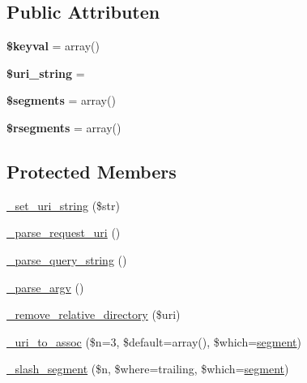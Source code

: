 \subsection*{Public Attributen}
\begin{DoxyCompactItemize}
\item 
\mbox{\label{class_c_i___u_r_i_ae15942155aae4760439f552ad1fc3c34}} 
{\bfseries \$keyval} = array()
\item 
\mbox{\label{class_c_i___u_r_i_ab908b3e655463a05e8a646c965ca4e53}} 
{\bfseries \$uri\+\_\+string} = \textquotesingle{}\textquotesingle{}
\item 
\mbox{\label{class_c_i___u_r_i_a8d7f597e2b6cf2aaef663822d1b96a82}} 
{\bfseries \$segments} = array()
\item 
\mbox{\label{class_c_i___u_r_i_abf60189292b5fda02cdf36e5d7417a33}} 
{\bfseries \$rsegments} = array()
\end{DoxyCompactItemize}
\subsection*{Protected Members}
\begin{DoxyCompactItemize}
\item 
\mbox{\hyperlink{class_c_i___u_r_i_a81a4c4d50fbac24b9ae091f9cfcaade3}{\+\_\+set\+\_\+uri\+\_\+string}} (\$str)
\item 
\mbox{\hyperlink{class_c_i___u_r_i_ae2e75a6f6657df51c7b6de926979af29}{\+\_\+parse\+\_\+request\+\_\+uri}} ()
\item 
\mbox{\hyperlink{class_c_i___u_r_i_a2bb6abbe64a923ffef79a4a4c3da93db}{\+\_\+parse\+\_\+query\+\_\+string}} ()
\item 
\mbox{\hyperlink{class_c_i___u_r_i_a336e05909197d401613263ebdab6550c}{\+\_\+parse\+\_\+argv}} ()
\item 
\mbox{\hyperlink{class_c_i___u_r_i_a01fdc82a66a1611d3e5d42461c1ad59c}{\+\_\+remove\+\_\+relative\+\_\+directory}} (\$uri)
\item 
\mbox{\hyperlink{class_c_i___u_r_i_a8a4949bcf405b03c1bf2cd94e689a0c7}{\+\_\+uri\+\_\+to\+\_\+assoc}} (\$n=3, \$default=array(), \$which=\textquotesingle{}\mbox{\hyperlink{class_c_i___u_r_i_aeea297fbd38079886a2de35d633c1ed5}{segment}}\textquotesingle{})
\item 
\mbox{\hyperlink{class_c_i___u_r_i_a98974ace6ccf1b5e0923a7de9018095a}{\+\_\+slash\+\_\+segment}} (\$n, \$where=\textquotesingle{}trailing\textquotesingle{}, \$which=\textquotesingle{}\mbox{\hyperlink{class_c_i___u_r_i_aeea297fbd38079886a2de35d633c1ed5}{segment}}\textquotesingle{})
\end{DoxyCompactItemize}
